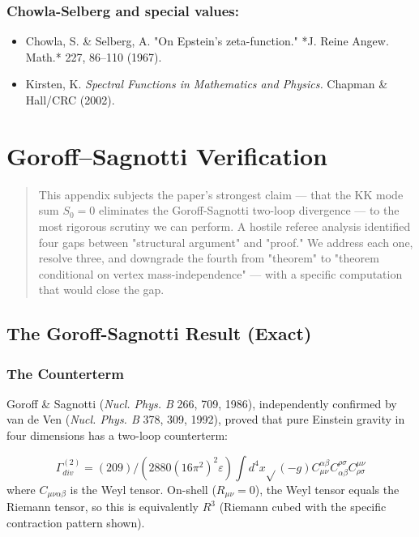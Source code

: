\documentclass[aps,prd,preprint,superscriptaddress,longbibliography,floatfix]{revtex4-2}
\theoremstyle{remark}
\begin{document}
\subsubsection{Chowla-Selberg and special values:}

\begin{itemize}
  \item Chowla, S. \& Selberg, A. "On Epstein's zeta-function." *J. Reine Angew. Math.* 227, 86--110 (1967).
  \item Kirsten, K. \textit{Spectral Functions in Mathematics and Physics.} Chapman \& Hall/CRC (2002).
\end{itemize}


\section{Goroff--Sagnotti Verification}


\begin{quote}
This appendix subjects the paper's strongest claim --- that the KK mode sum
$S_{0} = 0$ eliminates the Goroff-Sagnotti two-loop divergence --- to the most
rigorous scrutiny we can perform. A hostile referee analysis identified four
gaps between "structural argument" and "proof." We address each one, resolve
three, and downgrade the fourth from "theorem" to "theorem conditional on
vertex mass-independence" --- with a specific computation that would close
the gap.
\end{quote}



\subsection{The Goroff-Sagnotti Result (Exact)}


\subsubsection{The Counterterm}

Goroff \& Sagnotti (\textit{Nucl. Phys. B} 266, 709, 1986), independently confirmed by van de Ven (\textit{Nucl. Phys. B} 378, 309, 1992), proved that pure Einstein gravity in four dimensions has a two-loop counterterm:


\begin{equation}
    \Gamma^{(2)}_{div} = (209)/(2880(16\pi^{2})^{2}\varepsilon) \int d^{4}x \sqrt{}(-g) C^{\alpha\beta}_{\mu\nu} C^{\rho\sigma}_{\alpha\beta} C^{\mu\nu}_{\rho\sigma}
\end{equation}
where $C_{\mu\nu\alpha\beta}$ is the Weyl tensor. On-shell ($R_{\mu\nu} = 0$), the Weyl tensor equals the Riemann tensor, so this is equivalently $R^{3}$ (Riemann cubed with the specific contraction pattern shown).
\end{document}

